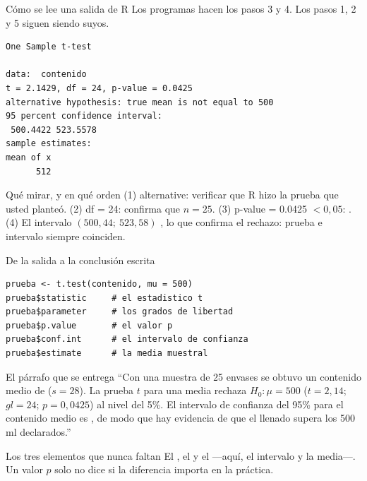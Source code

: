 \documentclass[aspectratio=169,10pt]{beamer}
\newcommand{\fx}[1]{{\ttfamily\color{uniAzul}#1}}
\begin{document}
\begin{frame}[fragile]{Cómo se lee una salida de R}
  \scriptsize
  Los programas hacen los pasos 3 y 4. Los pasos 1, 2 y 5 siguen siendo suyos.
\begin{lstlisting}[style=Rout]
	One Sample t-test

data:  contenido
t = 2.1429, df = 24, p-value = 0.0425
alternative hypothesis: true mean is not equal to 500
95 percent confidence interval:
 500.4422 523.5578
sample estimates:
mean of x
      512
\end{lstlisting}

  \vspace{-0.05cm}
  \begin{alertblock}{Qué mirar, y en qué orden}
    \tiny
    (1) \fx{alternative}: verificar que R hizo la prueba que usted planteó. \quad
    (2) \fx{df = 24}: confirma que $n = 25$. \quad
    (3) \fx{p-value = 0.0425} $< 0{,}05$: . \quad
    (4) El intervalo $(500{,}44;\ 523{,}58)$ , lo que
    confirma el rechazo: prueba e intervalo siempre coinciden.
  \end{alertblock}
\end{frame}

\begin{frame}[fragile]{De la salida a la conclusión escrita}
  \scriptsize
\begin{lstlisting}[style=Rmini]
prueba <- t.test(contenido, mu = 500)
prueba$statistic     # el estadistico t
prueba$parameter     # los grados de libertad
prueba$p.value       # el valor p
prueba$conf.int      # el intervalo de confianza
prueba$estimate      # la media muestral
\end{lstlisting}

  \vspace{0.05cm}
  \begin{exampleblock}{El párrafo que se entrega}
    \tiny
    ``Con una muestra de 25 envases se obtuvo un contenido medio de
     ($s = 28$). La prueba $t$ para una media rechaza
    $H_0: \mu = 500$ ($t = 2{,}14$; $gl = 24$; $p = 0{,}0425$) al nivel del
    5\%. El intervalo de confianza del 95\% para el contenido medio es
    , de modo que hay evidencia de que el llenado
    supera los 500 ml declarados.''
  \end{exampleblock}

  \vspace{0.05cm}
  \begin{alertblock}{Los tres elementos que nunca faltan}
    \tiny
    El , el
     y el  —aquí, el intervalo
    y la media—. Un valor $p$ solo no dice si la diferencia importa en la
    práctica.
  \end{alertblock}
\end{frame}
\end{document}
